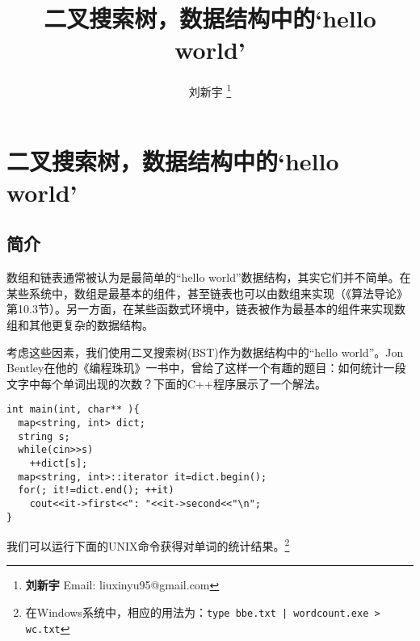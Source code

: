 \documentclass[UTF8]{article}
\begin{document}


\title{二叉搜索树，数据结构中的`hello world'}

\author{刘新宇
\thanks{{\bfseries 刘新宇} \newline
  Email: liuxinyu95@gmail.com \newline}
  }

\maketitle
\fi


\ifx\wholebook\relax
\chapter{二叉搜索树，数据结构中的`hello world'}
\fi

\section{简介}
\label{introduction} 

数组和链表通常被认为是最简单的“hello world”数据结构，其实它们并不简单。在某些系统中，数组是最基本的组件，甚至链表也可以由数组来实现（《算法导论》第10.3节\cite{CLRS}）。另一方面，在某些函数式环境中，链表被作为最基本的组件来实现数组和其他更复杂的数据结构。

考虑这些因素，我们使用二叉搜索树(BST)作为数据结构中的“hello world”。Jon Bentley在他的《编程珠玑》一书中，曾给了这样一个有趣的题目\cite{Bentley}：如何统计一段文字中每个单词出现的次数？下面的C++程序展示了一个解法。

\lstset{language=C++}
\begin{lstlisting}
int main(int, char** ){
  map<string, int> dict;
  string s;
  while(cin>>s)
    ++dict[s];
  map<string, int>::iterator it=dict.begin();
  for(; it!=dict.end(); ++it)
    cout<<it->first<<": "<<it->second<<"\n";
}
\end{lstlisting}

我们可以运行下面的UNIX命令获得对单词的统计结果。\footnote{在Windows系统中，相应的用法为：\texttt{type bbe.txt | wordcount.exe > wc.txt}}
\end{document}
